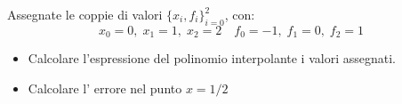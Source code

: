 Assegnate le coppie di valori $\{x_i,f_i \}_{i=0}^2$, con:
\[
x_0=0, \; x_1=1, \; x_2=2 \quad f_0=-1, \; f_1=0, \; f_2=1
\]
\begin{itemize}
\item  Calcolare l'espressione del polinomio interpolante i
valori assegnati.
\item
Calcolare l' errore nel punto $x=1/2$

\end{itemize}
